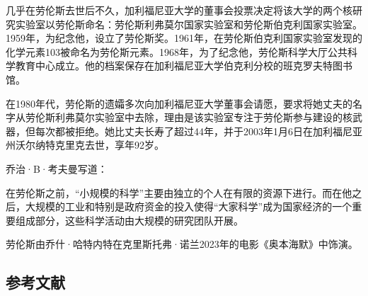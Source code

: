 几乎在劳伦斯去世后不久，加利福尼亚大学的董事会投票决定将该大学的两个核研究实验室以劳伦斯命名：劳伦斯利弗莫尔国家实验室和劳伦斯伯克利国家实验室。1959年，为纪念他，设立了劳伦斯奖。1961年，在劳伦斯伯克利国家实验室发现的化学元素103被命名为劳伦斯元素。1968年，为了纪念他，劳伦斯科学大厅公共科学教育中心成立。他的档案保存在加利福尼亚大学伯克利分校的班克罗夫特图书馆。

在1980年代，劳伦斯的遗孀多次向加利福尼亚大学董事会请愿，要求将她丈夫的名字从劳伦斯利弗莫尔实验室中去除，理由是该实验室专注于劳伦斯参与建设的核武器，但每次都被拒绝。她比丈夫长寿了超过44年，并于2003年1月6日在加利福尼亚州沃尔纳特克里克去世，享年92岁。

乔治·B·考夫曼写道：

在劳伦斯之前，“小规模的科学”主要由独立的个人在有限的资源下进行。而在他之后，大规模的工业和特别是政府资金的投入使得“大家科学”成为国家经济的一个重要组成部分，这些科学活动由大规模的研究团队开展。

劳伦斯由乔什·哈特内特在克里斯托弗·诺兰2023年的电影《奥本海默》中饰演。
\subsection{参考文献}
